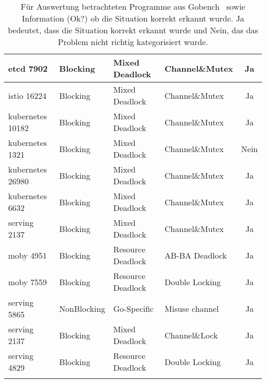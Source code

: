 \begin{longtable}[c]{|l|l|l|l|c|}
  etcd 7902            & Blocking      & Mixed Deadlock         & Channel\&Mutex         & Ja                                   \\ \hline
  istio 16224           & Blocking      & Mixed Deadlock         & Channel\&Mutex         & Ja                                   \\ \hline
  kubernetes 10182           & Blocking      & Mixed Deadlock         & Channel\&Mutex         & Ja                                   \\ \hline
  kubernetes 1321            & Blocking      & Mixed Deadlock         & Channel\&Mutex         & Nein                                 \\ \hline
  kubernetes 26980           & Blocking      & Mixed Deadlock         & Channel\&Mutex         & Ja                                   \\ \hline
  kubernetes 6632            & Blocking      & Mixed Deadlock         & Channel\&Mutex         & Ja                                   \\ \hline
  serving 2137            & Blocking      & Mixed Deadlock         & Channel\&Mutex         & Ja                                   \\ \hline
  moby 4951            & Blocking      & Resource Deadlock      & AB-BA Deadlock         & Ja                                   \\ \hline
  moby 7559            & Blocking      & Resource Deadlock      & Double Locking         & Ja                                   \\ \hline
  serving 5865            & NonBlocking   & Go-Specific            & Misuse channel         & Ja                                   \\ \hline
  serving 2137            & Blocking      & Mixed Deadlock         & Channel\&Lock          & Ja                                   \\ \hline
  serving 4829            & Blocking      & Resource Deadlock      & Double Locking         & Ja                                   \\ \hline
  \caption{Für Auswertung betrachteten 
  Programme aus Gobench~\cite{gobench} sowie 
  Information (Ok?) ob die Situation korrekt erkannt wurde. Ja bedeutet, dass 
  die Situation korrekt erkannt wurde
  und Nein, das das Problem nicht richtig kategorisiert wurde.}
  \label{App-Goker}
  \end{longtable}